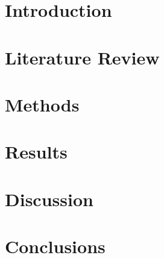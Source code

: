 \documentclass{report}
\newif\iffullsubmission
\begin{document}
    \iffullsubmission        
        \begin{singlespace}
            
    \fi
            \tableofcontents
    \iffullsubmission
        \end{singlespace}

        \chapter*{Abstract}
        \addcontentsline{toc}{chapter}{Abstract}  

            
    \fi
    
    \chapter{Introduction}\label{ch:introduction}
        
        
    \chapter{Literature Review}\label{ch:lit-review}
        

    \chapter{Methods}\label{ch:methods}
        

    \chapter{Results}\label{ch:results}
        

    \chapter{Discussion}\label{ch:discussion}
        

    \chapter{Conclusions}\label{ch:conclusions}
        

    
\end{document}
